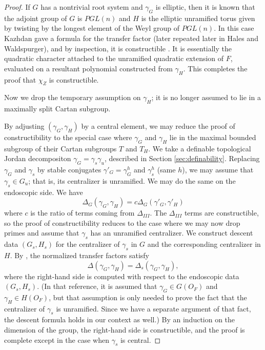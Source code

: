 \begin{proof}
If $G$ has a nontrivial root system and $\gamma_G$ is elliptic, then it is known that the adjoint group of $G$ is $PGL(n)$ and $H$ is the elliptic
unramified torus given by twisting by the longest element of the Weyl group of $PGL(n)$.  In this case Kazhdan gave a formula for the transfer factor 
(later repeated later in Hales and Waldspurger), and by inspection, it is constructible \cite{kazhdan1983lifting}.  It is essentially the
quadratic character attached to the unramified quadratic extension of $F$,
evaluated on a resultant polynomial constructed from $\gamma_H$.   This completes the proof that $\chi_Z$ is constructible.

Now we drop the temporary assumption on $\gamma_H$; it is no longer assumed to lie in a maximally split Cartan subgroup.


By adjusting $(\gamma_G,\gamma_H)$ by a central element, we may reduce the proof of constructibility to the special case  where $\gamma_G$ and
$\gamma_H$ lie in the maximal bounded subgroup of their Cartan subgroups $T$ and $T_H$.
We take a definable topological Jordan decompositon $\gamma_G = \gamma_s \gamma_u$, described in Section \ref{sec:definability}.
Replacing $\gamma_G$ and $\gamma_s$ by stable conjugates $\gamma'_G=\gamma_G^h$ and $\gamma_s^h$ (same $h$), we may assume that
$\gamma_s\in G_u$; that is, its centralizer is unramified.  We may do the same on the endoscopic side.  We have 
\[
\Delta_G(\gamma_G,\gamma_H) = c \Delta_G(\gamma'_G,\gamma'_H)
\]
where $c$ is the ratio of terms coming from $\Delta_{III}$.  The $\Delta_{III}$ terms are constructible, so the proof of constructibility reduces to
the case where we may now drop primes and assume that $\gamma_s$ has an unramified centralizer.
We construct descent data $(G_s,H_s)$ for the centralizer of $\gamma_s$ in $G$ and the corresponding centralizer in $H$.
By \cite{hales1993simple}, the normalized transfer factors satisfy
\[
\Delta(\gamma_G,\gamma_H) = \Delta_s(\gamma_G,\gamma_H),
\]
where the right-hand side is computed with respect to the endoscopic data $(G_s,H_s)$.
(In that reference, it is assumed that $\gamma_G\in G(O_F)$ and $\gamma_H\in H(O_F)$, but that assumption is only needed 
to prove the fact that the centralizer of $\gamma_s$ is unramified.  Since we have a separate argument of that fact, the descent formula
holds in our context as well.)
By an induction on the dimension of the group, the right-hand side is constructible, and the proof is complete except in the case
when $\gamma_s$ is central.


\end{proof}
